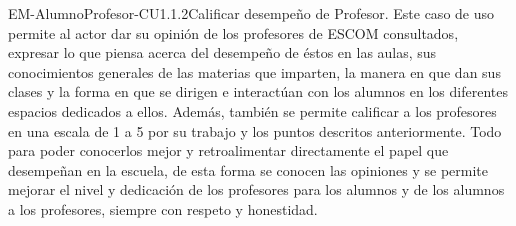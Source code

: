 \begin{UseCase}{EM-AlumnoProfesor-CU1.1.2}{Calificar desempeño de Profesor.}{
	\noindent
	Este caso de uso permite al actor dar su opinión de los profesores de ESCOM consultados, expresar lo que piensa acerca del desempeño de éstos en las aulas, sus conocimientos generales de las materias que imparten, la manera en que dan sus clases y la forma en que se dirigen e interactúan con los alumnos en los diferentes espacios dedicados a ellos. Además, también se permite calificar a los profesores en una escala de 1 a 5 por su trabajo y los puntos descritos anteriormente. Todo para poder conocerlos mejor y retroalimentar directamente el papel que desempeñan en la escuela, de esta forma se conocen las opiniones y se permite mejorar el nivel y dedicación de los profesores para los alumnos y de los alumnos a los profesores, siempre con respeto y honestidad.
	\newline
	}
\end{UseCase}
